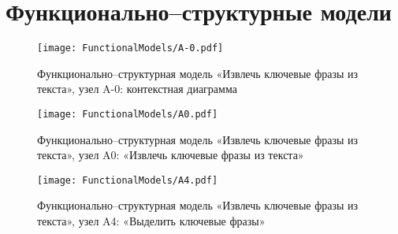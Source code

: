 \chapter{Функционально--структурные модели}
\label{chap:FunctionalModels}
\clearpage

\begin{landscape}
\begin{figure}[ht]
  \centering
  \texttt{[image: FunctionalModels/A-0.pdf]}
  \caption{Функционально--структурная модель «Извлечь ключевые фразы из
текста», узел A-0: контекстная диаграмма}
  \label{fig:FunctionalModels:A-0}
\end{figure}

\begin{figure}[ht]
  \centering
  \texttt{[image: FunctionalModels/A0.pdf]}
  \caption{Функционально--структурная модель «Извлечь ключевые фразы из
текста», узел A0: «Извлечь ключевые фразы из текста»}
  \label{fig:FunctionalModels:A0}
\end{figure}

\begin{figure}[ht]
  \centering
  \texttt{[image: FunctionalModels/A4.pdf]}
  \caption{Функционально--структурная модель «Извлечь ключевые фразы из
текста», узел A4: «Выделить ключевые фразы»}
  \label{fig:FunctionalModels:A4}
\end{figure}
\end{landscape}
